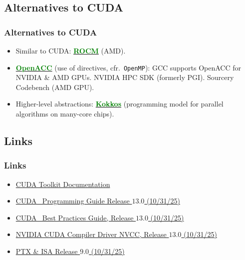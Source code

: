 \subsection{Alternatives to CUDA}

\begin{frame}
  \frametitle{Alternatives to CUDA}
  \begin{itemize}
    \item Similar to CUDA:
          \href{https://www.amd.com/en/products/software/rocm.html}{\textbf{\textcolor{green}{ROCM}}} (AMD).
    \item \href{https://www.openacc.org/}{\textbf{\textcolor{green}{OpenACC}}}
          (use of directives, cfr.\ \texttt{OpenMP}):
          GCC supports OpenACC for NVIDIA \& AMD GPUs.
          NVIDIA HPC SDK (formerly PGI).
          Sourcery Codebench (AMD GPU).
    \item Higher-level abstractions:
          \href{https://www.kokkos.org/about/core/}{\textbf{\textcolor{green}{Kokkos}}}
          (programming model for parallel algorithms on many-core chips).
  \end{itemize}
\end{frame}

\subsection{Links}

\begin{frame}
  \frametitle{Links}
  \begin{itemize}
    \item \href{https://docs.nvidia.com/cuda/index.html}{CUDA Toolkit Documentation}
    \item \href{https://docs.nvidia.com/cuda/cuda-c-programming-guide/index.html}{CUDA \CC\, Programming Guide Release $13.0$ (10/31/25)}
    \item \href{https://docs.nvidia.com/cuda/cuda-c-best-practices-guide/index.html}{CUDA \CC\, Best Practices Guide, Release $13.0$ (10/31/25)}
    \item \href{https://docs.nvidia.com/cuda/cuda-compiler-driver-nvcc/}{NVIDIA CUDA Compiler Driver NVCC, Release $13.0$ (10/31/25)}
    \item \href{https://docs.nvidia.com/cuda/parallel-thread-execution/}{PTX \& ISA Release $9.0$ (10/31/25)}
  \end{itemize}
\end{frame}
